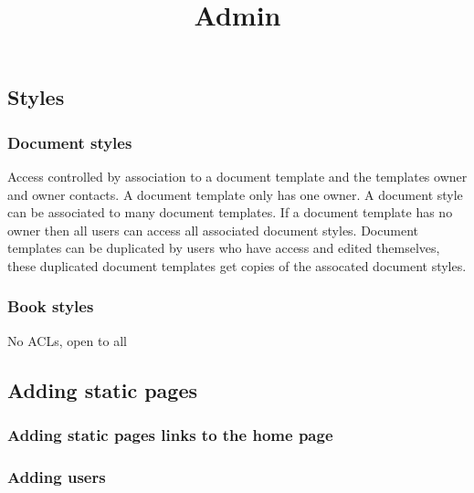 \documentclass{article}
\begin{document}
\title{Admin}

\maketitle





\subsection{Styles}\label{H6398346}



\subsubsection{Document styles}\label{H436640}



Access controlled by association to a document template and the templates owner and owner contacts. A document template only has one owner. A document style can be associated to many document templates. If a document template has no owner then all users can access all associated document styles. Document templates can be duplicated by users who have access and edited themselves, these duplicated document templates get copies of the assocated document styles.


\subsubsection{Book styles}\label{H1305016}



No ACLs, open to all


\subsection{Adding static pages}\label{H8791447}






\subsubsection{Adding static pages links to the home page}\label{H2279564}



\subsubsection{Adding users}\label{H9537775}
\end{document}

